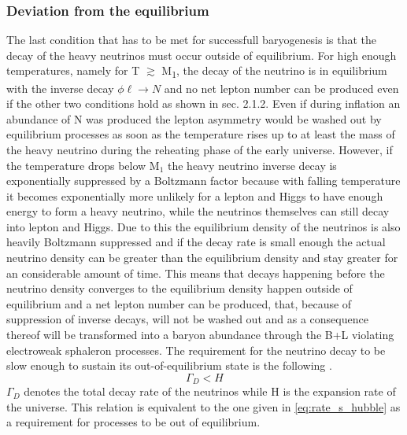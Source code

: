 \subsubsection{Deviation from the equilibrium}
The last condition that has to be met for successfull baryogenesis is that the decay of the heavy neutrinos must occur outside of equilibrium. For high enough temperatures, namely for T $\gtrsim$ M\textsubscript{1}, the decay of the neutrino is in equilibrium with the inverse decay $\phi\ell\rightarrow N$ and no net lepton number can be produced even if the other two conditions hold as shown in sec. 2.1.2. Even if during inflation an abundance of N was produced the lepton asymmetry would be washed out by equilibrium processes as soon as the temperature rises up to at least the mass of the heavy neutrino during the reheating phase of the early universe. \newline\indent
However, if the temperature drops below M$_1$ the heavy neutrino inverse decay is exponentially suppressed by a Boltzmann factor because with falling temperature it becomes exponentially more unlikely for a lepton and Higgs to have enough energy to form a heavy neutrino, while the neutrinos themselves can still decay into lepton and Higgs. Due to this the equilibrium density of the neutrinos is also heavily Boltzmann suppressed and if the decay rate is small enough the actual neutrino density can be greater than the equilibrium density and stay greater for an considerable amount of time. This means that decays happening before the neutrino density converges to the equilibrium density happen outside of equilibrium and a net lepton number can be produced, that, because of suppression of inverse decays, will not be washed out and as a consequence thereof will be transformed into a baryon abundance through the B+L violating electroweak sphaleron processes.\newline\indent
The requirement for the neutrino decay to be slow enough to sustain its out-of-equilibrium state is the following \cite[p. 30]{Taanila:2008}.
\begin{equation}
	\Gamma_D<H
	\label{eq:out_of_eq}
\end{equation}
$\Gamma_D$ denotes the total decay rate of the neutrinos while H is the expansion rate of the universe. This relation is equivalent to the one given in \eqref{eq:rate_s_hubble} as a requirement for processes to be out of equilibrium. 